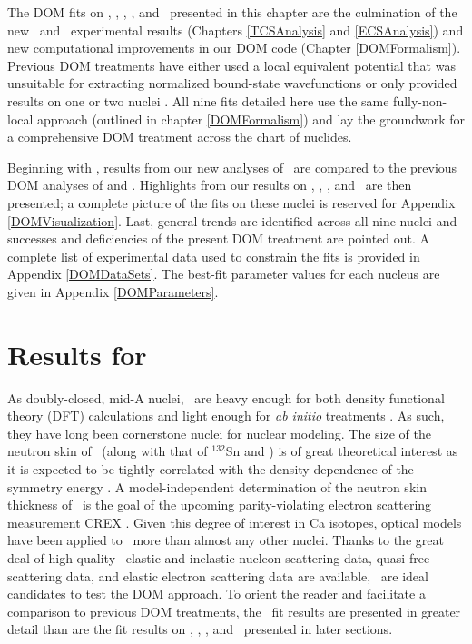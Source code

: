 The \gls{DOM} fits on \oSixEight, \caAughtEight, \niEightFour,
\snTwelveFour, and \pbEight\ presented in
this chapter are the culmination of the new \tot\ and \el\ experimental results
(Chapters \ref{TCSAnalysis} and \ref{ECSAnalysis})
and new computational improvements in our DOM code (Chapter \ref{DOMFormalism}).
Previous DOM treatments have either used a
local equivalent potential \cite{Charity2006, Mueller2011} that was unsuitable for extracting
normalized bound-state wavefunctions or only provided results on one or
two nuclei \cite{Mahzoon2017, Atkinson2018}. All nine fits detailed here use the same fully-non-
local approach
(outlined in chapter \ref{DOMFormalism}) and lay the groundwork for a comprehensive DOM treatment 
across the chart of nuclides.

Beginning with \caForty, results from our new analyses of
\caAughtEight\ are compared to the previous
DOM analyses of \cite{MahzoonPhDThesis} and 
\cite{Atkinson2018}. Highlights from our results on \oSixEight, \niEightFour, \snTwelveFour,
and \pbEight\ are then presented; a complete picture of the fits on these nuclei
is reserved for Appendix \ref{DOMVisualization}. Last, general trends are identified across
all nine nuclei and successes and deficiencies of the present DOM treatment are pointed out.
A complete list of experimental data used to constrain the fits is provided in Appendix
\ref{DOMDataSets}. The best-fit parameter values for each nucleus are given in Appendix
\ref{DOMParameters}.

\section{Results for \caAughtEight}
As doubly-closed, mid-A nuclei, \caAughtEight\ are heavy enough for both density functional
theory (DFT) calculations \cite{Piekarewicz2012} and light enough for \textit{ab initio} 
treatments \cite{Hagen2016}. As such, they have long been cornerstone nuclei for
nuclear modeling. The size of the neutron skin of \caEight\ (along with that of $^{132}$Sn and
\pbEight) is of great theoretical interest as it is expected to be tightly correlated with the
density-dependence of the symmetry energy \cite{Fattoyev2012}. A model-independent determination
of the neutron skin thickness of \caEight\ is the goal of the upcoming parity-violating
electron scattering measurement CREX \cite{Horowitz2014}. Given this degree of interest in Ca
isotopes, optical models have been applied to
\caAughtEight\ more than almost any other nuclei. Thanks to the
great deal of high-quality \caAughtEight\ 
elastic and inelastic nucleon scattering data, quasi-free scattering data, and elastic electron
scattering data are available, \caAughtEight\ are ideal
candidates to test the DOM approach. To orient the
reader and facilitate a comparison to previous DOM treatments, the \caAughtEight\ fit results are
presented in greater detail than are the fit results on \oSixEight, \niEightFour,
\snTwelveFour, and \pbEight\ presented in later sections.

